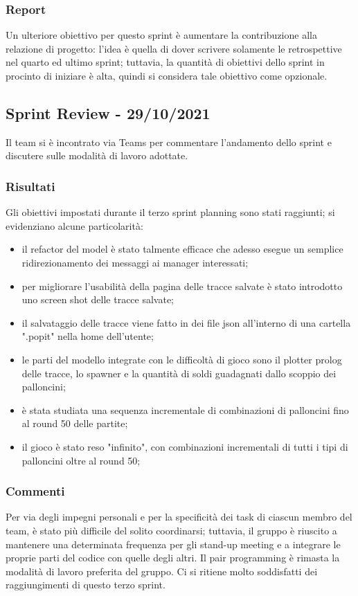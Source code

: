 \subsubsection{Report}
Un ulteriore obiettivo per questo sprint è aumentare la contribuzione alla relazione di progetto: l'idea è quella di
dover scrivere solamente le retrospettive nel quarto ed ultimo sprint; tuttavia, la quantità di obiettivi dello sprint
in procinto di iniziare è alta, quindi si considera tale obiettivo come opzionale.

\subsection{Sprint Review - 29/10/2021}
Il team si è incontrato via Teams per commentare l'andamento dello sprint e discutere sulle modalità di lavoro adottate.

\subsubsection{Risultati}
Gli obiettivi impostati durante il terzo sprint planning sono stati raggiunti; si evidenziano alcune particolarità:
\begin{itemize}
    \item il refactor del model è stato talmente efficace che adesso esegue un semplice ridirezionamento dei messaggi ai manager interessati;
    \item per migliorare l'usabilità della pagina delle tracce salvate è stato introdotto uno screen shot delle tracce salvate;
    \item il salvataggio delle tracce viene fatto in dei file json all'interno di una cartella ".popit" nella home dell'utente;
    \item le parti del modello integrate con le difficoltà di gioco sono il plotter prolog delle tracce, lo spawner e la quantità di soldi guadagnati dallo scoppio dei palloncini;
    \item è stata studiata una sequenza incrementale di combinazioni di palloncini fino al round 50 delle partite;
    \item il gioco è stato reso "infinito", con combinazioni incrementali di tutti i tipi di palloncini oltre al round 50;
\end{itemize}

\subsubsection{Commenti}
Per via degli impegni personali e per la specificità dei task di ciascun membro del team, è stato più difficile del
solito coordinarsi; tuttavia, il gruppo è riuscito a mantenere una determinata frequenza per gli stand-up meeting e a
integrare le proprie parti del codice con quelle degli altri. Il pair programming è rimasta la modalità di lavoro
preferita del gruppo. Ci si ritiene molto soddisfatti dei raggiungimenti di questo terzo sprint.

\newpage